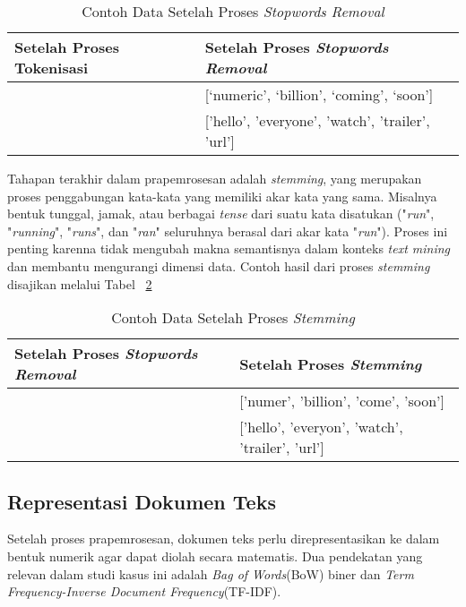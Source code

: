 \documentclass[a4paper,12pt]{report}
\numberwithin{equation}{chapter}
\begin{document}
\begin{table}[h!]
\centering
\caption{Contoh Data Setelah Proses \textit{Stopwords Removal}}
\label{tab:StopWord}
\begin{tabularx}{\textwidth}{|X|X|}
\hline
\textbf{Setelah Proses Tokenisasi} & \textbf{Setelah Proses \textit{Stopwords Removal}} \\
\hline
[`numeric', `billion', `coming', `soon'] & 
[`numeric', `billion', `coming', `soon'] \\
\hline
['hello', 'everyone', 'watch', 'this', 'trailer', 'url'] &
['hello', 'everyone', 'watch', 'trailer', 'url']
\\
\hline
\end{tabularx}
\end{table}

Tahapan terakhir dalam prapemrosesan adalah \textit{stemming}, yang merupakan proses penggabungan kata-kata yang memiliki akar kata yang sama. Misalnya bentuk tunggal, jamak, atau berbagai \textit{tense} dari suatu kata disatukan ("\textit{run}", "\textit{running}", "\textit{runs}", dan "\textit{ran}" seluruhnya berasal dari akar kata "\textit{run}"). Proses ini penting karenna tidak mengubah makna semantisnya dalam konteks \textit{text mining} dan membantu mengurangi dimensi data. Contoh hasil dari proses \textit{stemming} disajikan melalui Tabel ~\ref{tab:stemming}

\begin{table}[h!]
\centering
\caption{Contoh Data Setelah Proses \textit{Stemming}}
\label{tab:stemming}
\begin{tabularx}{\textwidth}{|X|X|}
\hline
\textbf{Setelah Proses \textit{Stopwords Removal}} & \textbf{Setelah Proses \textit{Stemming}} \\
\hline
[`numeric', `billion', `coming', `soon'] & ['numer', 'billion', 'come', 'soon'] \\
\hline
['hello', 'everyone', 'watch', 'trailer', 'url'] & ['hello', 'everyon', 'watch', 'trailer', 'url']
\\
\hline
\end{tabularx}
\end{table}

\subsection{Representasi Dokumen Teks}
Setelah proses prapemrosesan, dokumen teks perlu direpresentasikan ke dalam bentuk numerik agar dapat diolah secara matematis. Dua pendekatan yang relevan dalam studi kasus ini adalah \textit{Bag of Words}(BoW) biner dan \textit{Term Frequency-Inverse Document Frequency}(TF-IDF).
\end{document}
